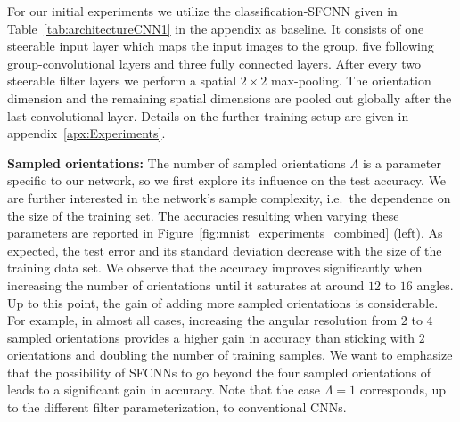 \documentclass[10pt,twocolumn,letterpaper]{article}
\newcommand{\myparagraph}[1]{\vspace*{1ex}\noindent\textbf{#1}}
\begin{document}
For our initial experiments we utilize the classification-\mbox{SFCNN} given in Table~\ref{tab:architectureCNN1} in the appendix as baseline.
It consists of one steerable input layer which maps the input images to the group, five following group-convolutional layers and three fully connected layers.
After every two steerable filter layers we perform a spatial $2\times2$ max-pooling.
The orientation dimension and the remaining spatial dimensions are pooled out globally after the last convolutional layer.
Details on the further training setup are given in appendix~\ref{apx:Experiments}.



\myparagraph{Sampled orientations:}
The number of sampled orientations $\Lambda$ is a parameter specific to our network, so we first explore its influence on the test accuracy.
We are further interested in the network's sample complexity, i.e.~the dependence on the size of the training set.
The accuracies resulting when varying these parameters are reported in Figure~\ref{fig:mnist_experiments_combined} (left).
As expected, the test error and its standard deviation decrease with the size of the training data set.
We observe that the accuracy improves significantly when increasing the number of orientations until it saturates at around $12$ to $16$ angles.
Up to this point, the gain of adding more sampled orientations is considerable.
For example, in almost all cases, increasing the angular resolution from $2$ to $4$ sampled orientations provides a higher gain in accuracy than sticking with $2$ orientations and doubling the number of training samples.
We want to emphasize that the possibility of \mbox{SFCNNs} to go beyond the four sampled orientations of \citep{dieleman2016exploiting, cohen2016group, cohen2016steerable} leads to a significant gain in accuracy.
Note that the case $\Lambda=1$ corresponds, up to the different filter parameterization, to conventional CNNs.
\end{document}

